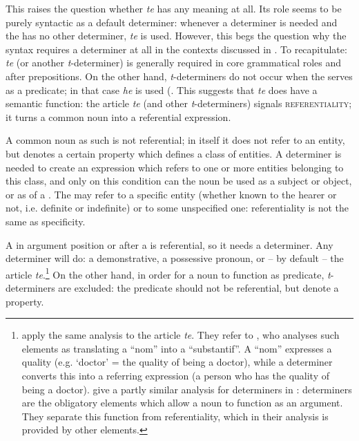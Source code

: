 This raises the question whether \textit{te} has any meaning at all. Its role seems to be purely syntactic as a default determiner: whenever a determiner is needed and the  has no other determiner, \textit{te} is used. However, this begs the question why the syntax requires a determiner at all in the contexts discussed in . To recapitulate: \textit{te} (or another \textit{t}-determiner) is generally required in core grammatical roles and after prepositions. On the other hand, \textit{t}-determiners do not occur when the  serves as a predicate; in that case \textit{he} is used (. This suggests that \textit{te} does have a semantic function: the article \textit{te} (and other \textit{t}-determiners) signals \textsc{referentiality}; it turns a common noun into a referential expression. 

A common noun as such is not referential; in itself it does not refer to an entity, but denotes a certain property which defines a class of entities. A determiner is needed to create an expression which refers to one or more entities belonging to this class, and only on this condition can the noun be used as a subject or object, or as  of a . The  may refer to a specific entity (whether known to the hearer or not, i.e. definite or indefinite) or to some unspecified one: referentiality is not the same as specificity. 

A  in argument position or after a  is referential, so it needs a determiner. Any determiner will do: a demonstrative, a possessive pronoun, or – by default – the article \textit{te}.\footnote{\label{fn:253}\citet[467]{RigoVernaudon2004} apply the same analysis to the  article \textit{te}. They refer to \citet{Lemaréchal1989}, who analyses such elements as translating a “nom” into a “substantif”. A “nom” expresses a quality (e.g. ‘doctor’ = the quality of being a doctor), while a determiner converts this into a referring expression (a person who has the quality of being a doctor). \citet{GorrieKellner2010} give a partly similar analysis for determiners in : determiners are the obligatory elements which allow a noun to function as an argument. They separate this function from referentiality, which in their analysis is provided by other  elements.} On the other hand, in order for a noun to function as predicate, \textit{t}{}-determiners are excluded: the predicate should not be referential, but denote a property.

